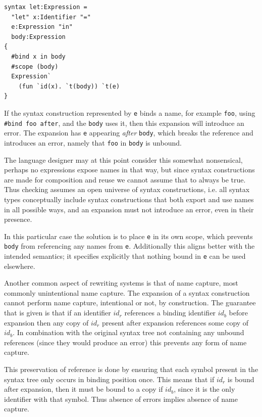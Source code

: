 \documentclass{kththesis}
\begin{document}
\begin{verbatim}
syntax let:Expression =
  "let" x:Identifier "="
  e:Expression "in"
  body:Expression
{
  #bind x in body
  #scope (body)
  Expression`
    (fun `id(x). `t(body)) `t(e)
}
\end{verbatim}

If the syntax construction represented by \texttt{e} binds a name, for example \texttt{foo}, using \texttt{#bind foo after}, and the \texttt{body} uses it, then this expansion will introduce an error. The expansion has \texttt{e} appearing \emph{after} \texttt{body}, which breaks the reference and introduces an error, namely that \texttt{foo} in \texttt{body} is unbound.

The language designer may at this point consider this somewhat nonsensical, perhaps no expressions expose names in that way, but since syntax constructions are made for composition and reuse we cannot assume that to always be true. Thus checking assumes an open universe of syntax constructions, i.e. all syntax types conceptually include syntax constructions that both export and use names in all possible ways, and an expansion must not introduce an error, even in their presence.

In this particular case the solution is to place \texttt{e} in its own scope, which prevents \texttt{body} from referencing any names from \texttt{e}. Additionally this aligns better with the intended semantics; it specifies explicitly that nothing bound in \texttt{e} can be used elsewhere.

Another common aspect of rewriting systems is that of name capture, most commonly unintentional name capture. The expansion of a syntax construction cannot perform name capture, intentional or not, by construction. The guarantee that is given is that if an identifier $id_r$ references a binding identifier $id_b$ before expansion then any copy of $id_r$ present after expansion references some copy of $id_b$. In combination with the original syntax tree not containing any unbound references (since they would produce an error) this prevents any form of name capture.

This preservation of reference is done by ensuring that each symbol present in the syntax tree only occurs in binding position once. This means that if $id_r$ is bound after expansion, then it must be bound to a copy if $id_b$, since it is the only identifier with that symbol. Thus absence of errors implies absence of name capture.
\end{document}
